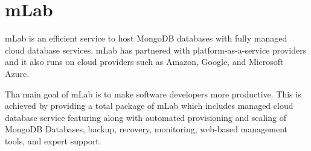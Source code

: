 \section{mLab}

mLab is an efficient service to host MongoDB databases with fully managed cloud
database services. mLab has partnered with platform-as-a-service providers and
it also runs on cloud providers such as Amazon, Google, and Microsoft Azure.

Tha main goal of mLab is to make software developers more productive.  This is
achieved by providing a total package of mLab which includes managed cloud
database service featuring along with automated provisioning and scaling of
MongoDB Databases, backup, recovery, monitoring, web-based management tools,
and expert support.~\cite{mLab}